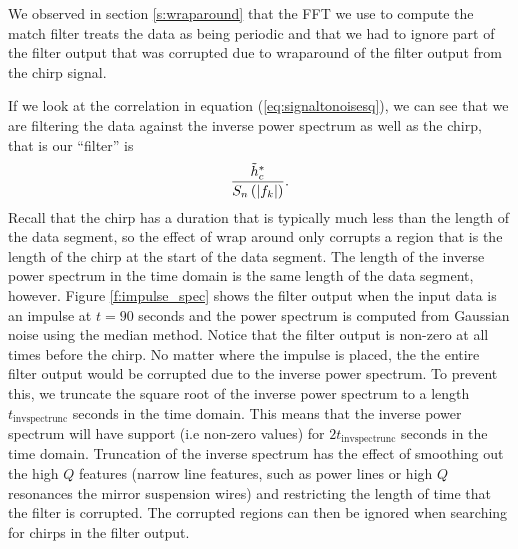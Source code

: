 We observed in section \ref{s:wraparound} that the FFT we use to compute the
match filter treats the data as being periodic and that we had to ignore part
of the filter output that was corrupted due to wraparound of the filter output
from the chirp signal. 

If we look at the correlation in equation (\ref{eq:signaltonoisesq}), we can
see that we are filtering the data against the inverse power
spectrum as well as the chirp, that is our ``filter'' is
\begin{equation}
\frac{\tilde{h}_c^\ast}{S_n\left(\left|f_{k}\right|\right)}.
\end{equation}
Recall that the chirp has a duration that is typically much less than the
length of the data segment, so the effect of wrap around only corrupts a
region that is the length of the chirp at the start of the data segment.  The
length of the inverse power spectrum in the time domain is the same length of
the data segment, however. Figure \ref{f:impulse_spec} shows the filter output
when the input data is an impulse at $t=90$ seconds and the power spectrum is
computed from Gaussian noise using the median method. Notice that the filter
output is non-zero at all times before the chirp. No matter where the impulse
is placed, the the entire filter output would be corrupted due to the inverse
power spectrum.  To prevent this, we truncate the square root of the inverse
power spectrum to a length $t_\mathrm{invspectrunc}$ seconds in the time
domain. This means that the inverse power spectrum will have support (i.e
non-zero values) for $2t_\mathrm{invspectrunc}$ seconds in the time domain.
Truncation of the inverse spectrum has the effect of smoothing out the high
$Q$ features (narrow line features, such as power lines or high $Q$ resonances
the mirror suspension wires) and restricting the length of time that the filter 
is corrupted. The corrupted regions can then be ignored when searching for
chirps in the filter output.

